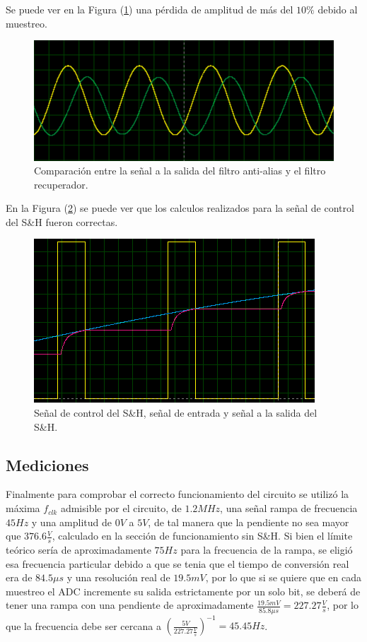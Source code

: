 Se puede ver en la Figura (\ref{result2}) una pérdida de amplitud de más del $10\%$ debido al muestreo.

\begin{figure}[H]
\centering
\includegraphics[width=0.8\linewidth, page=1]{ImagenesEjercicio1/result2.png}
\caption{Comparación entre la señal a la salida del filtro anti-alias y el filtro recuperador.}
\label{result2}
\end{figure}

En la Figura (\ref{sh}) se puede ver que los calculos realizados para la señal de control del S\&H fueron correctas.

\begin{figure}[H]
\centering
\includegraphics[width=0.8\linewidth, page=1]{ImagenesEjercicio1/S_H.png}
\caption{Señal de control del S\&H, señal de entrada y señal a la salida del S\&H.}
\label{sh}
\end{figure}

\subsection{Mediciones}
Finalmente para comprobar el correcto funcionamiento del circuito se utilizó la máxima $f_{clk}$ admisible por el circuito, de $1.2MHz$, una señal rampa de frecuencia $45Hz$ y una amplitud de $0V$ a $5V$, de tal manera que la pendiente no sea mayor que $376.6\frac{V}{s}$, calculado en la sección de funcionamiento sin S\&H. Si bien el límite teórico sería de aproximadamente $75Hz$ para la frecuencia de la rampa, se eligió esa frecuencia particular debido a que se tenia que el tiempo de conversión real era de $84.5\mu s$ y una resolución real de $19.5 mV$, por lo que si se quiere que en cada muestreo el ADC incremente su salida estrictamente por un solo bit, se deberá de tener una rampa con una pendiente de aproximadamente $\frac{19.5mV}{85.8\mu s} = 227.27 \frac{V}{s}$, por lo que la frecuencia debe ser cercana a $\left(\frac{5V}{227.27\frac{V}{s}}\right)^{-1} = 45.45Hz$.

